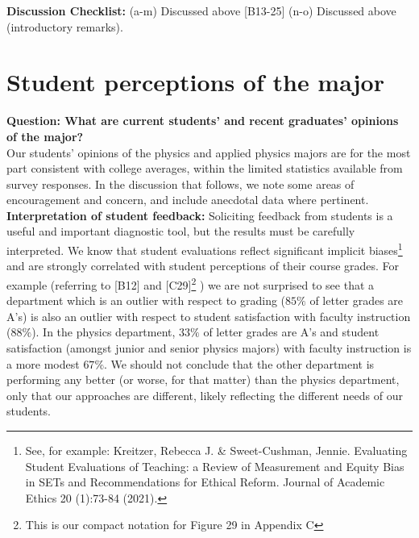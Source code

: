 \documentclass[12pt]{article}
\begin{document}
\noindent
{\bf Discussion Checklist:} (a-m) Discussed above [B13-25] (n-o)
Discussed above (introductory remarks).

\newpage
\section{Student perceptions of the major}
\label{sec:perceptions}

{\bf Question: What are current students' and recent graduates'
  opinions of the major? }\\
  
\noindent
Our students' opinions of the physics and applied physics majors are
for the most part consistent with college averages, within the limited
statistics available from survey responses.  In the discussion that
follows, we note some areas of encouragement and concern, and include
anecdotal data where pertinent.\\[3pt]

\noindent
{\bf Interpretation of student feedback:} Soliciting feedback from
students is a useful and important diagnostic tool, but the results
must be carefully interpreted.  We know that student evaluations
reflect significant implicit biases\footnote{See, for example:
  Kreitzer, Rebecca J. \& Sweet-Cushman, Jennie. Evaluating Student
  Evaluations of Teaching: a Review of Measurement and Equity Bias in
  SETs and Recommendations for Ethical Reform. Journal of Academic
  Ethics 20 (1):73-84 (2021).}  and are strongly correlated with
student perceptions of their course grades.  For example (referring
to [B12] and [C29]\footnote{This is our compact notation for Figure 29 in Appendix C} 
 ) we are not surprised to see that a department which
is an outlier with respect to grading ($85\%$ of letter grades are
A's) is also an outlier with respect to student satisfaction with
faculty instruction ($88\%$).  In the physics department, $33\%$ of
letter grades are A's and student satisfaction (amongst junior and
senior physics majors) with faculty instruction is a more modest
$67\%$.  We should not conclude that the other department is
performing any better (or worse, for that matter) than the physics
department, only that our approaches are different, likely reflecting
the different needs of our students.\\[3pt]
\end{document}
